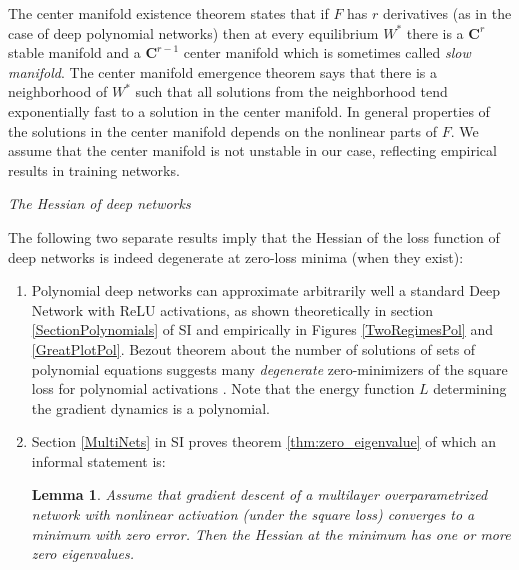 \documentclass[10pt]{article}
\newtheorem{lemma}{Lemma}
\begin{document}
The center manifold existence theorem \cite{Carr81} states that if $F$ has $r$
derivatives (as in the case of deep polynomial networks) then at every
equilibrium $W^*$ there is a $\mathbf{C}^r$ stable manifold and a $\mathbf{C}^{r-1}$
center manifold which is sometimes called {\it slow manifold}. The
center manifold emergence theorem says that there is a neighborhood of
$W^*$ such that all solutions from the neighborhood tend exponentially
fast to a solution in the center manifold. In general properties of the
solutions in the center manifold depends on the nonlinear parts of
$F$. We assume that the center manifold is not unstable in our case,
reflecting empirical results in training networks.

{\it The Hessian of deep networks}

%
%

The following two separate results imply that the Hessian of the
loss function of deep networks is indeed degenerate at zero-loss minima
(when they exist):

\begin{enumerate}
\item Polynomial deep networks can approximate arbitrarily well a
  standard Deep Network with ReLU activations, as shown theoretically
  in section \ref{SectionPolynomials} of SI and empirically in Figures
  \ref{TwoRegimesPol} and \ref{GreatPlotPol}. Bezout theorem about the
  number of solutions of sets of polynomial equations suggests many
  {\it degenerate} zero-minimizers of the square loss for polynomial
  activations \cite{Theory_II}.  Note that the energy function $L$ determining
  the gradient dynamics is a polynomial.
\item Section \ref{MultiNets} in SI proves theorem
  \ref{thm:zero_eigenvalue} of which an informal statement is: 
  
\begin{lemma}
\label{Kenji}
Assume that gradient descent of a multilayer overparametrized network
with nonlinear activation (under the square loss) converges to a
minimum with zero error. Then the Hessian at the minimum has one or
more zero eigenvalues.
\end{lemma}
\end{enumerate}
\end{document}
